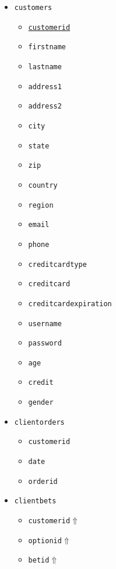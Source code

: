 \documentclass{article}
\begin{document}
\begin{multicols}{2}
\begin{itemize}
    \item\texttt{customers}
        \begin{itemize}
            \item\texttt{\underline{customerid}} 
            \item\texttt{firstname}
            \item\texttt{lastname}
            \item\texttt{address1}
            \item\texttt{address2}
            \item\texttt{city}
            \item\texttt{state}
            \item\texttt{zip}
            \item\texttt{country}
            \item\texttt{region}
            \item\texttt{email}
            \item\texttt{phone}
            \item\texttt{creditcardtype}
            \item\texttt{creditcard}
            \item\texttt{creditcardexpiration}
            \item\texttt{username}
            \item\texttt{password}
            \item\texttt{age}
            \item\texttt{credit}
            \item\texttt{gender}
        \end{itemize}
    \item\texttt{clientorders}
        \begin{itemize}
            \item\texttt{customerid}
            \item\texttt{date}
            \item\texttt{orderid}
        \end{itemize}
    \columnbreak
    \item\texttt{clientbets}
        \begin{itemize}
            \item\texttt{customerid$\Uparrow$}
            \item\texttt{optionid}$\Uparrow$
            \item\texttt{betid}$\Uparrow$

\end{itemize}
\end{itemize}
\end{multicols}
\end{document}
